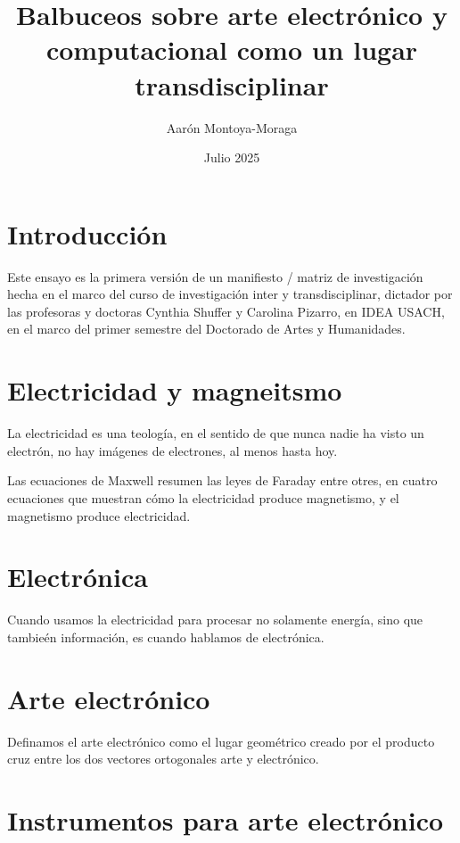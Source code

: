 \documentclass{article}
\title{Balbuceos sobre arte electrónico y computacional como un lugar transdisciplinar}
\author{Aarón Montoya-Moraga}
\date{Julio 2025}
\begin{document}
\maketitle

\renewcommand*\contentsname{Tabla de contenidos}

\tableofcontents

\section{Introducción}

Este ensayo es la primera versión de un manifiesto / matriz de investigación hecha en el marco del curso de investigación inter y transdisciplinar, dictador por las profesoras y doctoras Cynthia Shuffer y Carolina Pizarro, en IDEA USACH, en el marco del primer semestre del Doctorado de Artes y Humanidades.



\section{Electricidad y magneitsmo}

La electricidad es una teología, en el sentido de que nunca nadie ha visto un electrón, no hay imágenes de electrones, al menos hasta hoy.

Las ecuaciones de Maxwell resumen las leyes de Faraday entre otres, en cuatro ecuaciones que muestran cómo la electricidad produce magnetismo, y el magnetismo produce electricidad.

\section{Electrónica}

Cuando usamos la electricidad para procesar no solamente energía, sino que tambieén información, es cuando hablamos de electrónica.

\section{Arte electrónico}

Definamos el arte electrónico como el lugar geométrico creado por el producto cruz entre los dos vectores ortogonales arte y electrónico.

\section{Instrumentos para arte electrónico}
\end{document}
